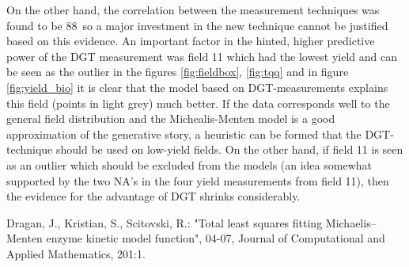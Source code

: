 \documentclass[11pt,fleqn]{article}
\begin{document}
On the other hand, the correlation between the measurement techniques was found to be 88\pro\ so a major investment in the new technique cannot be justified based on this evidence. 
An important factor in the hinted, higher predictive power of the DGT measurement was field 11 which had the lowest yield and can be seen as the outlier in the figures \ref{fig:fieldbox}, \ref{fig:tqq} and in figure \ref{fig:yield_bio} it is clear that the model based on DGT-measurements explains this field (points in light grey) much better. 
If the data corresponds well to the general field distribution and the Michealis-Menten model is a good approximation of the generative story, a heuristic can be formed that the DGT-technique should be used on low-yield fields. 
On the other hand, if field 11 is seen as an outlier which should be excluded from the models (an idea somewhat supported by the two NA's in the four yield measurements from field 11), then the evidence for the advantage of DGT shrinks considerably.


\begin{thebibliography}{9}
	Dragan, J., Kristian, S., Scitovski, R.: "Total least squares fitting Michaelis–Menten enzyme kinetic model function", 04-07, Journal of Computational and Applied Mathematics, 201:1. 

\end{thebibliography}
\end{document}
